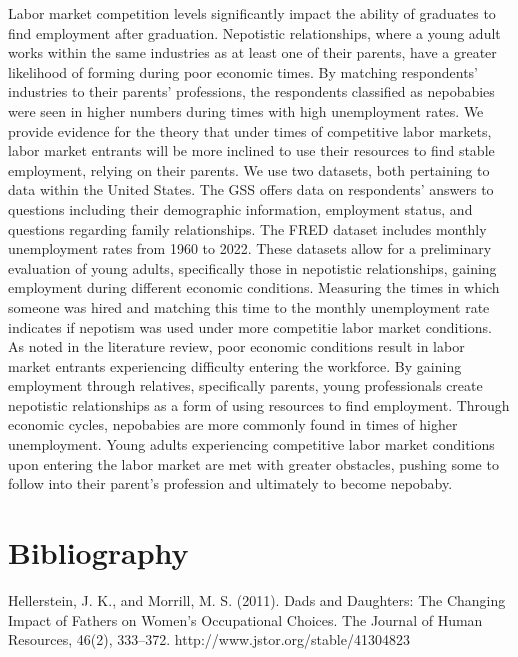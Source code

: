 \documentclass[12pt]{article}
\begin{document}
Labor market competition levels significantly impact the ability of graduates to find employment after graduation. Nepotistic relationships, where a young adult works within the same industries as at least one of their parents, have a greater likelihood of forming during poor economic times. By matching respondents’ industries to their parents’ professions, the respondents classified as nepobabies were seen in higher numbers during times with high unemployment rates. We provide evidence for the theory that under times of competitive labor markets, labor market entrants will be more inclined to use their resources to find stable employment, relying on their parents. 
We use two datasets, both pertaining to data within the United States. The GSS offers data on respondents' answers to questions including their demographic information, employment status, and questions regarding family relationships. The FRED dataset includes monthly unemployment rates from 1960 to 2022. These datasets allow for a preliminary evaluation of young adults, specifically those in nepotistic relationships, gaining employment during different economic conditions.
Measuring the times in which someone was hired and matching this time to the monthly unemployment rate indicates if nepotism was used under more competitie labor market conditions. As noted in the literature review, poor economic conditions result in labor market entrants experiencing difficulty entering the workforce. By gaining employment through relatives, specifically parents, young professionals create nepotistic relationships as a form of using resources to find employment. Through economic cycles, nepobabies are more commonly found in times of higher unemployment. Young adults experiencing competitive labor market conditions upon entering the labor market are met with greater obstacles, pushing some to follow into their parent's profession and ultimately to become nepobaby. 



\newpage
\section*{Bibliography}
\singlespacing
\setlength\bibsep{1pt}

\hspace{1cm}Hellerstein, J. K., and Morrill, M. S. (2011). Dads and Daughters: The Changing Impact of Fathers on Women’s Occupational Choices. The Journal of Human Resources, 46(2), 333–372. http://www.jstor.org/stable/41304823
\end{document}
